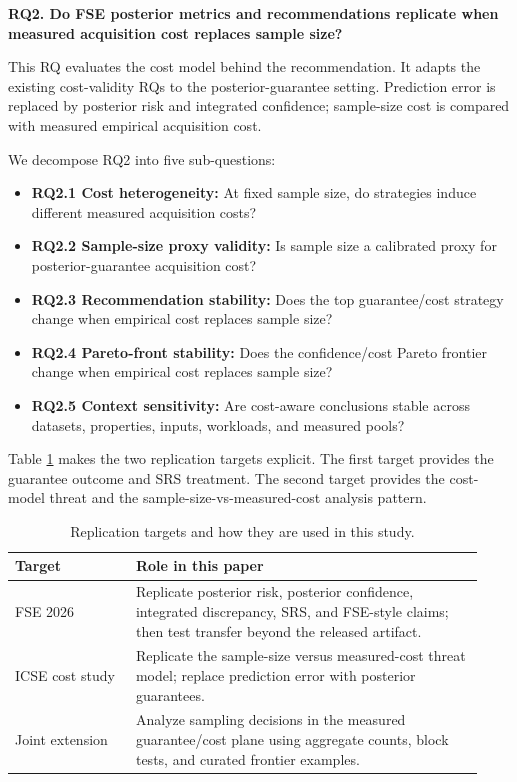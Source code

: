 \documentclass[smallcondensed]{svjour3}
\providecommand{\tightlist}{%
  \setlength{\itemsep}{0pt}\setlength{\parskip}{0pt}}
\begin{document}
\textbf{RQ2. Do FSE posterior metrics and recommendations replicate when
measured acquisition cost replaces sample size?}

This RQ evaluates the cost model behind the recommendation. It adapts
the existing cost-validity RQs to the posterior-guarantee setting.
Prediction error is replaced by posterior risk and integrated
confidence; sample-size cost is compared with measured empirical
acquisition cost.

We decompose RQ2 into five sub-questions:

\begin{itemize}
\tightlist
\item
  \textbf{RQ2.1 Cost heterogeneity:} At fixed sample size, do strategies
  induce different measured acquisition costs?
\item
  \textbf{RQ2.2 Sample-size proxy validity:} Is sample size a calibrated
  proxy for posterior-guarantee acquisition cost?
\item
  \textbf{RQ2.3 Recommendation stability:} Does the top guarantee/cost
  strategy change when empirical cost replaces sample size?
\item
  \textbf{RQ2.4 Pareto-front stability:} Does the confidence/cost Pareto
  frontier change when empirical cost replaces sample size?
\item
  \textbf{RQ2.5 Context sensitivity:} Are cost-aware conclusions stable
  across datasets, properties, inputs, workloads, and measured pools?
\end{itemize}

Table \ref{tab:replication-targets} makes the two replication targets
explicit. The first target provides the guarantee outcome and SRS
treatment. The second target provides the cost-model threat and the
sample-size-vs-measured-cost analysis pattern.

\begin{table}[H]
\caption{Replication targets and how they are used in this study.}
\label{tab:replication-targets}
\centering
\small
\begin{tabular}{@{}p{0.24\linewidth}p{0.69\linewidth}@{}}
\toprule
Target & Role in this paper \\
\midrule
FSE 2026 & Replicate posterior risk, posterior confidence, integrated discrepancy, SRS, and FSE-style claims; then test transfer beyond the released artifact. \\
ICSE cost study & Replicate the sample-size versus measured-cost threat model; replace prediction error with posterior guarantees. \\
Joint extension & Analyze sampling decisions in the measured guarantee/cost plane using aggregate counts, block tests, and curated frontier examples. \\
\bottomrule
\end{tabular}
\end{table}
\end{document}
